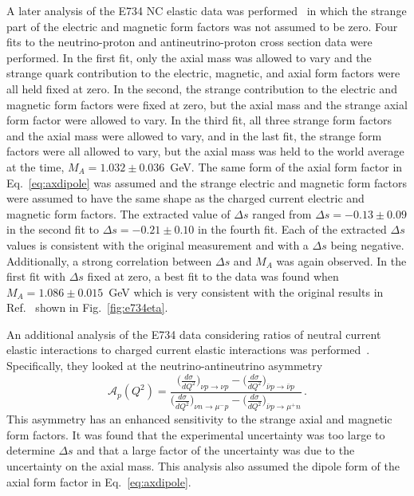   A later analysis of the E734 NC elastic data was
  performed~\cite{Garvey:1992cg} in which the strange part of the electric
  and magnetic form factors was not assumed to be zero. Four fits to the
  neutrino-proton and antineutrino-proton cross section data were performed.
  In the first fit, only the axial mass was allowed to vary and the strange
  quark contribution to the electric, magnetic, and axial form factors were
  all held fixed at zero. In the second, the strange contribution to the
  electric and magnetic form factors were fixed at zero, but the axial mass
  and the strange axial form factor were allowed to vary. In the third fit,
  all three strange form factors and the axial mass were allowed to vary, and
  in the last fit, the strange form factors were all allowed to vary, but the
  axial mass was held to the world average at the time, $M_A =
  1.032\pm0.036$~GeV. The same form of the axial form factor in
  Eq.~\ref{eq:axdipole} was assumed and the strange electric and magnetic
  form factors were assumed to have the same shape as the charged current
  electric and magnetic form factors. The extracted value of $\Delta s$
  ranged from $\Delta s = -0.13 \pm 0.09$ in the second fit to $\Delta s =
  -0.21 \pm 0.10$ in the fourth fit.  Each of the extracted $\Delta s$ values
  is consistent with the original measurement and with a $\Delta s$ being
  negative.  Additionally, a strong correlation between $\Delta s$ and $M_A$
  was again observed. In the first fit with $\Delta s$ fixed at zero, a best
  fit to the data was found when $M_A = 1.086 \pm 0.015$~GeV which is very
  consistent with the original results in Ref.~\cite{Ahrens:1986xe} shown in
  Fig.~\ref{fig:e734eta}.

  An additional analysis of the E734 data considering ratios of neutral
  current elastic interactions to charged current elastic interactions was
  performed~\cite{Alberico:1998qw}. Specifically, they looked at the
  neutrino-antineutrino asymmetry
  \begin{equation}
    \mathcal{A}_p(Q^2) = \frac{\Big(\frac{d\sigma}{dQ^2}\Big)_{\nu p \rightarrow \nu p} - \Big(\frac{d\sigma}{dQ^2}\Big)_{\bar{\nu} p \rightarrow \bar{\nu} p} }{\Big(\frac{d\sigma}{dQ^2}\Big)_{\nu n \rightarrow \mu^- p} - \Big(\frac{d\sigma}{dQ^2}\Big)_{\bar{\nu} p \rightarrow \mu^+ n}} \,.
  \end{equation}
  This asymmetry has an enhanced sensitivity to the strange axial and magnetic
  form factors. It was found that the experimental uncertainty was too large to
  determine $\Delta s$ and that a large factor of the uncertainty was due to
  the uncertainty on the axial mass. This analysis also assumed the dipole form
  of the axial form factor in Eq.~\ref{eq:axdipole}.

